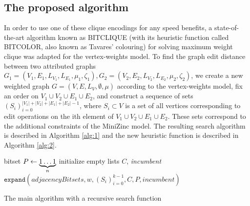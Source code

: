 \documentclass{article}
\theoremstyle{definition}
\begin{document}
\subsection{The proposed algorithm}
In order to use one of these clique encodings for any speed benefits, a state-of-the-art algorithm known as BITCLIQUE (with its heuristic function called BITCOLOR, also known as Tavares' colouring) for solving maximum weight clique was adapted for the vertex-weights model. To find the graph edit distance between two attributed graphs $G_1 = (V_1, E_1, L_{V_1}, L_{E_1}, \mu_1, \zeta_1), G_2 = (V_2, E_2, L_{V_2}, L_{E_2}, \mu_2, \zeta_2)$, we create a new weighted graph $G = (V, E, L_V, \emptyset, \mu)$ according to the vertex-weights model, fix an order on $V_1 \cup V_2 \cup E_1 \cup E_2$, and construct a sequence of sets $(S_i)_{i=0}^{|V_1|+|V_2|+|E_1|+|E_2|-1}$, where $S_i \subset V$ is a set of all vertices corresponding to edit operations on the ith element of $V_1 \cup V_2 \cup E_1 \cup E_2$. These sets correspond to the additional constraints of the MiniZinc model. The resulting search algorithm is described in Algorithm \ref{alg:1} and the new heuristic function is described in Algorithm \ref{alg:2}.
\begin{algorithm}
  bitset $P \gets \underbrace{1\dots1}_{\mathclap{n}}$\;
  initialize empty lists $C$, \textit{incumbent}\;
  $\mathtt{expand}(\mathit{adjacencyBitsets}, w, (S_i)_{i=0}^{k-1}, C, P, \mathit{incumbent})$\;
  \;
  \caption{The main algorithm with a recursive search function}
  \label{alg:1}
\end{algorithm}
\end{document}
